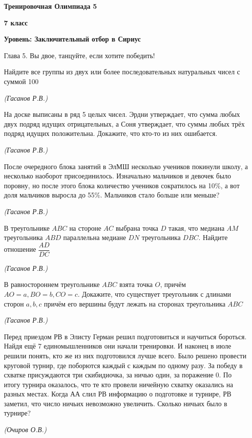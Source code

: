 \centerline{\Huge \bf  Тренировочная Олимпиада 5}
\centerline{\Huge \bf 7 класс}
\centerline{\Huge \bf Уровень: Заключительный отбор в Сириус}

\begin{flushright}
    \scriptsize{Глава 5. Вы двое, танцуйте, если хотите победить!}
\end{flushright}

Найдите все группы из двух или более последовательных натуральных чисел с суммой 100
\begin{flushright}
    \textit{\small{(Гасанов Р.В.)}}
\end{flushright}

На доске выписаны в ряд 5 целых чисел. Эрдни утверждает, что сумма любых двух подряд идущих отрицательных, а Соня утверждает, что суммы любых трёх подряд идущих положительна. Докажите, что кто-то из них ошибается.
\begin{flushright}
    \textit{\small{(Гасанов Р.В.)}}
\end{flushright}

После очередного блока занятий в ЭлМШ несколько учеников покинули школу, а несколько наоборот присоединилось. Изначально мальчиков и девочек было поровну, но после этого блока количество учеников сократилось на 10\%, а вот доля мальчиков выросла до 55\%. Мальчиков стало больше или меньше?
\begin{flushright}
    \textit{\small{(Гасанов Р.В.)}}
\end{flushright}

В треугольнике $ABC$ на стороне $AC$ выбрана точка $D$ такая, что медиана $AM$ треугольника $ABD$ параллельна медиане $DN$ треугольника $DBC$. Найдите отношение
$\dfrac{AD}{DC}$
\begin{flushright}
    \textit{\small{(Гасанов Р.В.)}}
\end{flushright}

В равностороннем треугольнике $ABC$ взята точка $O$, причём $AO = a, BO = b, CO = c.$ Докажите, что существует треугольник с длинами сторон $a, b, c$ причём его вершины будут лежать на сторонах треугольника $ABC$
\begin{flushright}
    \textit{\small{(Гасанов Р.В.)}}
\end{flushright}

Перед приездом РВ в Элисту Герман решил подготовиться и научиться бороться. Найдя ещё 7 единомышленников они начали тренировки. И наконец в июле решили понять, кто же из них подготовился лучше всего. Было решено провести круговой турнир, где поборются каждый с каждым по одному разу. За победу в схватке присуждаются три скибидиочка, за ничью один, за поражение 0. По итогу турнира оказалось, что те кто провели ничейную схватку оказались на разных местах. Когда АА слил РВ информацию о подготовке и турнире, РВ заметил, что число ничьих невозможно увеличить. Сколько ничьих было в турнире?
\begin{flushright}
    \vspace{-5mm}
    \textit{\small{(Очиров О.В.)}}
\end{flushright}
